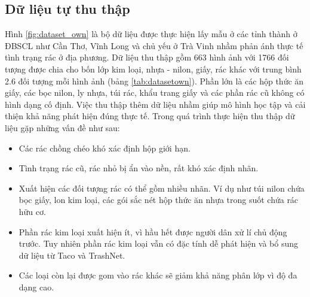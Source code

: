 \documentclass[../the.tex]{subfiles}
\begin{document}
\subsection{Dữ liệu tự thu thập}
\label{sec:own}
{\fontsize{13}{12} \selectfont

	Hình \ref{fig:dataset_own} là bộ dữ liệu được thực hiện lấy mẫu ở các tỉnh thành ở ĐBSCL như Cần Thơ, Vĩnh Long và chủ yếu ở Trà Vinh nhầm phản ánh thực tế tình trạng rác ở địa phương.
	Dữ liệu thu thập gồm 663 hình ảnh với 1766 đối tượng được chia cho bốn lớp kim loại, nhựa - nilon, giấy, rác khác với trung bình 2.6 đối tượng mỗi hình ảnh (bảng \ref{tab:datasetown}).
	Phần lớn là các hộp thức ăn giấy, các bọc nilon, ly nhựa, túi rác, khẩu trang giấy và các phần rác cũ không có hình dạng cố định.
	Việc thu thập thêm dữ liệu nhầm giúp mô hình học tập và cải thiện khả năng phát hiện đúng thực tế. Trong quá trình thực hiện thu thập dữ liệu gặp những vấn đề như sau:

	\begin{itemize}
		\item Các rác chồng chéo khó xác định hộp giới hạn.
		\item Tình trạng rác cũ, rác nhỏ bị ẩn vào nền, rất khó xác định nhãn.
		\item Xuất hiện các đối tượng rác có thể gồm nhiều nhãn. Ví dụ như túi nilon chứa bọc giấy, lon kim loại, các gói sắc nét hộp thức ăn nhựa trong suốt chứa rác hữu cơ.
		\item Phần rác kim loại xuất hiện ít, vì hầu hết được người dân xử lí chủ động trước. Tuy nhiên phần rác kim loại vẫn có đặc tính dễ phát hiện và bổ sung dữ liệu từ Taco \cite{proença2020taco} và TrashNet.
		\item Các loại còn lại được gom vào rác khác sẽ giảm khả năng phân lớp vì độ đa dạng cao.
	\end{itemize}

}
\end{document}
